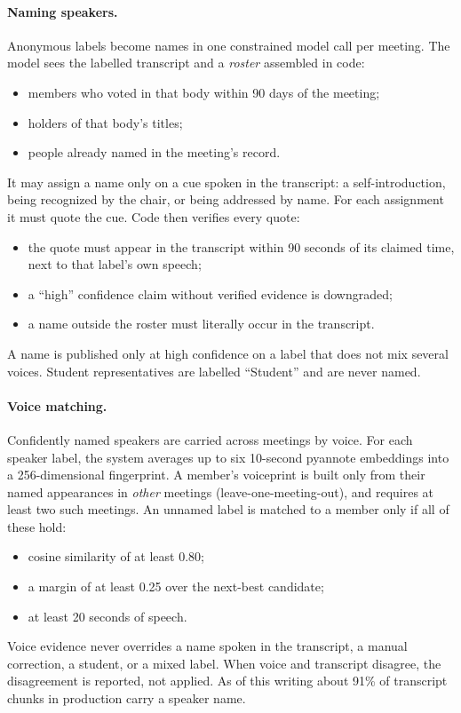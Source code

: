 \documentclass[11pt]{article}
\begin{document}
\paragraph{Naming speakers.} Anonymous labels become names in one constrained model
call per meeting. The model sees the labelled transcript and a \emph{roster} assembled
in code:
\begin{itemize}
  \item members who voted in that body within 90 days of the meeting;
  \item holders of that body's titles;
  \item people already named in the meeting's record.
\end{itemize}
It may assign a name only on a cue spoken in the transcript: a self-introduction,
being recognized by the chair, or being addressed by name. For each assignment it must
quote the cue. Code then verifies every quote:
\begin{itemize}
  \item the quote must appear in the transcript within 90 seconds of its claimed time,
        next to that label's own speech;
  \item a ``high'' confidence claim without verified evidence is downgraded;
  \item a name outside the roster must literally occur in the transcript.
\end{itemize}
A name is published only at high confidence on a label that does not mix several voices.
Student representatives are labelled ``Student'' and are never named.

\paragraph{Voice matching.} Confidently named speakers are carried across meetings by
voice. For each speaker label, the system averages up to six 10-second pyannote
embeddings into a 256-dimensional fingerprint. A member's voiceprint is built only from
their named appearances in \emph{other} meetings (leave-one-meeting-out), and requires at
least two such meetings. An unnamed label is matched to a member only if all of these hold:
\begin{itemize}
  \item cosine similarity of at least 0.80;
  \item a margin of at least 0.25 over the next-best candidate;
  \item at least 20 seconds of speech.
\end{itemize}
Voice evidence never overrides a name spoken in the transcript, a manual correction, a
student, or a mixed label. When voice and transcript disagree, the disagreement is
reported, not applied. As of this writing about 91\% of transcript chunks in production
carry a speaker name.
\end{document}
